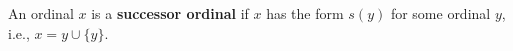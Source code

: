 An ordinal $x$ is a \textbf{successor ordinal} if $x$ has the form $s(y)$ for some ordinal $y$, i.e., $x = y \cup \{y\}$.
